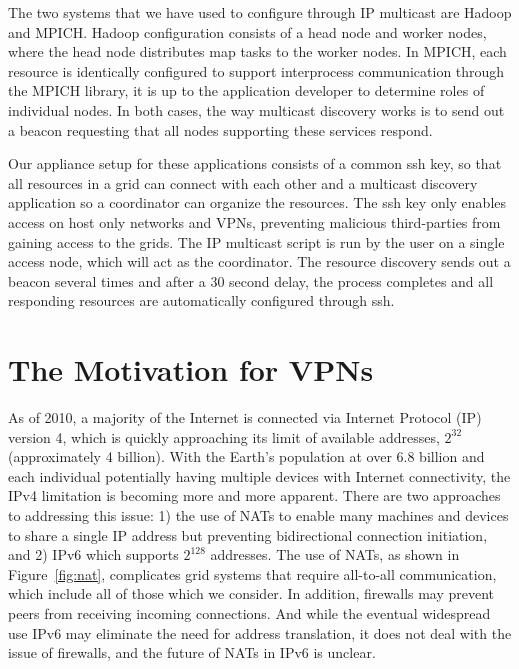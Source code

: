 \documentclass[conference]{IEEEtran}
\begin{document}
The two systems that we have used to configure through IP multicast are Hadoop
and MPICH.  Hadoop configuration consists of a head node and worker nodes,
where the head node distributes map tasks to the worker nodes.  In MPICH, each
resource is identically configured to support interprocess communication
through the MPICH library, it is up to the application developer to determine
roles of individual nodes.  In both cases, the way multicast discovery works is
to send out a beacon requesting that all nodes supporting these services
respond.

Our appliance setup for these applications consists of a common ssh key, so
that all resources in a grid can connect with each other and a multicast
discovery application so a coordinator can organize the resources.  The ssh key
only enables access on host only networks and VPNs, preventing malicious
third-parties from gaining access to the grids.  The IP multicast script is run
by the user on a single access node, which will act as the coordinator.  The
resource discovery sends out a beacon several times and after a 30 second
delay, the process completes and all responding resources are automatically
configured through ssh.

\section{The Motivation for VPNs}
\label{vpns}

As of 2010, a majority of the Internet is connected via Internet Protocol (IP)
version 4, which is quickly approaching its limit of available addresses,
$2^{32}$ (approximately 4 billion).  With the Earth's population at over 6.8
billion and each individual potentially having multiple devices with Internet
connectivity, the IPv4 limitation is becoming more and more apparent.  There
are two approaches to addressing this issue:  1) the use of NATs to enable many
machines and devices to share a single IP address but preventing bidirectional
connection initiation, and 2) IPv6 which supports $2^{128}$ addresses.  The use
of NATs, as shown in Figure~\ref{fig:nat}, complicates grid systems that
require all-to-all communication, which include all of those which we consider.
In addition, firewalls may prevent peers from receiving incoming connections.
And while the eventual widespread use IPv6 may eliminate the need for address
translation, it does not deal with the issue of firewalls, and the future of
NATs in IPv6 is unclear.
\end{document}
